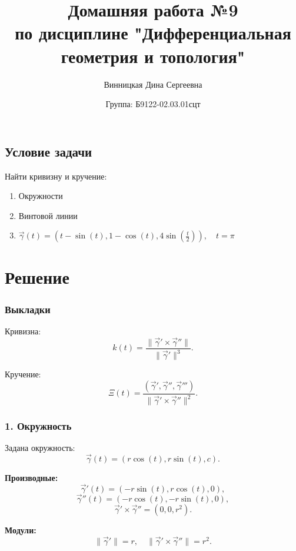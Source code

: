 \documentclass{article}
\title{\vspace{-1cm}Домашняя работа №9 \\ по дисциплине "Дифференциальная геометрия и топология"}
\author{Винницкая Дина Сергеевна}
\date{Группа: Б9122-02.03.01сцт}
\begin{document}
	
	\maketitle


        \subsection*{Условие задачи}
        Найти кривизну и кручение:
        \begin{enumerate}
                \item Окружности
                \item Винтовой линии
                \item $\vec{\gamma}(t) = \left(t - \sin(t), 1 - \cos(t), 4 \sin\left(\frac{t}{2}\right)\right), \quad t = \pi$
        \end{enumerate}
            
        \section*{Решение}
       \subsubsection*{Выкладки}
        Кривизна:
        \[
        k(t) = \frac{\|\vec{\gamma}' \times \vec{\gamma}''\|}{\|\vec{\gamma}'\|^3}.
        \]
        
        Кручение:
        \[
        \Xi(t) = \frac{(\vec{\gamma}', \vec{\gamma}'', \vec{\gamma}''')}{\|\vec{\gamma}' \times \vec{\gamma}''\|^2}.
        \]
        
        \subsubsection*{1. Окружность}
        
        Задана окружность:
        \[
        \vec{\gamma}(t) = (r \cos(t), r \sin(t), c).
        \]
        
        \textbf{Производные:}
        \[
        \vec{\gamma}'(t) = (-r \sin(t), r \cos(t), 0),
        \]
        \[
        \vec{\gamma}''(t) = (-r \cos(t), -r \sin(t), 0),
        \]
        \[
        \vec{\gamma}' \times \vec{\gamma}'' = (0, 0, r^2).
        \]
        
        \textbf{Модули:}
        \[
        \|\vec{\gamma}'\| = r, \quad \|\vec{\gamma}' \times \vec{\gamma}''\| = r^2.
        \]
        
\end{document}
